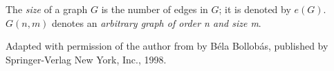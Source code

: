 \documentclass[12pt]{article}
\begin{document}
The \emph{size} of a graph $G$ is the number of edges in $G$; it is denoted by $e(G)$. $G(n,m)$ denotes an \emph{arbitrary graph of order n and size m}.


\footnotesize{Adapted with permission of the author from \emph{} by B\'{e}la Bollob\'{a}s, published by Springer-Verlag New York, Inc., 1998.}
\end{document}
